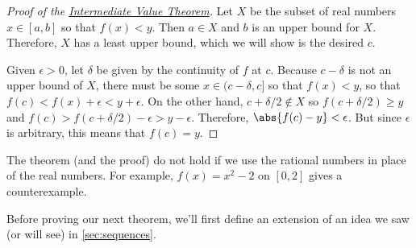 \begin{proof}[Proof of the {\hyperref[thm:IVT]{Intermediate Value Theorem}}]
\label{pf:IVT}
Let $X$ be the subset of real numbers $x\in[a,b]$ so that $f(x)<y$.  Then $a\in X$ and $b$ is an upper bound for $X$.  Therefore, $X$ has a least upper bound, which we will show is the desired $c$.

Given $\epsilon>0$, let $\delta$ be given by the continuity of $f$ at $c$.  Because $c-\delta$ is not an upper bound of $X$, there must be some $x\in(c-\delta,c]$ so that $f(x)<y$, so that $f(c)<f(x)+\epsilon<y+\epsilon$.  On the other hand, $c+\delta/2\notin X$ so $f(c+\delta/2)\ge y$ and $f(c)>f(c+\delta/2)-\epsilon>y-\epsilon$.  Therefore, $\abs{f(c)-y}<\epsilon$.  But since $\epsilon$ is arbitrary, this means that $f(c)=y$.
\end{proof}

The theorem (and the proof) do not hold if we use the rational numbers in place of the real numbers.  For example, $f(x)=x^2-2$ on $[0,2]$ gives a counterexample.


Before proving our next theorem, we'll first define an extension of an idea we saw (or will see) in \autoref{sec:sequences}.

